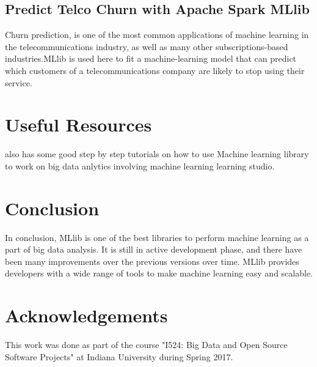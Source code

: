 \documentclass[9pt,twocolumn,twoside]{styles/osajnl}
\begin{document}
\subsection{Predict Telco Churn with Apache Spark MLlib}

Churn prediction, is one of the most common applications of machine
learning in the telecommunications industry, as well as many other
subscriptions-based industries.MLlib is used here to fit a
machine-learning model that can predict which customers of a
telecommunications company are likely to stop using their
service.\cite{TelcoChurn}

\section{Useful Resources}

\cite{Machine-Learning-Library-(MLlib-Guide)-website} also
has some good step by step tutorials on how to use Machine learning
library to work on big data anlytics involving machine learning
learning studio.

\section{Conclusion}

In conclusion, MLlib is one of the best libraries to perform machine
learning as a part of big data analysis. It is still in active
development phase, and there have been many improvements over the
previous versions over time. MLlib provides developers with a wide
range of tools to make machine learning easy and scalable.

\section{Acknowledgements}

This work was done as part of the course "I524: Big Data and Open
Source Software Projects" at Indiana University during Spring
2017. 


\end{document}
